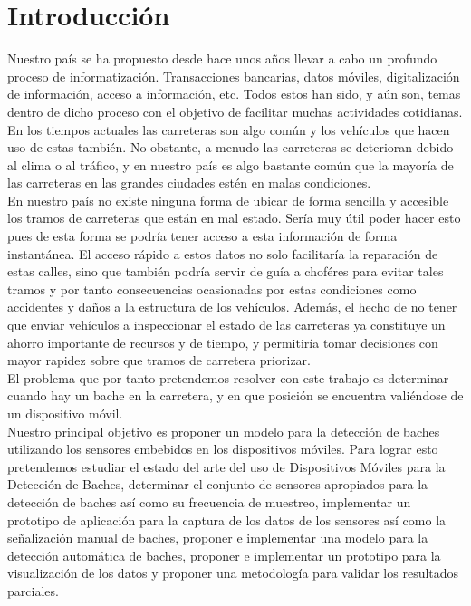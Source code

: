 \chapter*{Introducción}\label{chapter:introduction}

Nuestro país se ha propuesto desde hace unos años llevar a cabo un profundo proceso de informatización.
Transacciones bancarias, datos móviles, digitalización de información, acceso a información, etc. Todos
estos han sido, y aún son, temas dentro de dicho proceso con el objetivo de facilitar muchas actividades
cotidianas. En los tiempos actuales las carreteras son algo común y los vehículos que hacen uso de estas
también. No obstante, a menudo las carreteras se deterioran debido al clima o al tráfico, y en nuestro
país es algo bastante común que la mayoría de las carreteras en las grandes ciudades estén en malas condiciones.\\
En nuestro país no existe ninguna forma de ubicar de forma sencilla y accesible los tramos de carreteras que están
en mal estado. Sería muy útil poder hacer esto pues de esta forma se podría tener acceso a esta información de forma
instantánea. El acceso rápido a estos datos no solo facilitaría la reparación de estas calles, sino que también podría
servir de guía a choféres para evitar tales tramos y por tanto consecuencias ocasionadas por estas condiciones como 
accidentes y daños a la estructura de los vehículos. Además, el hecho de no tener que enviar vehículos a inspeccionar
el estado de las carreteras ya constituye un ahorro importante de recursos y de tiempo, y permitiría tomar decisiones 
con mayor rapidez sobre que tramos de carretera priorizar.\\
El problema que por tanto pretendemos resolver con este trabajo es determinar cuando hay un bache en la carretera, y
en que posición se encuentra valiéndose de un dispositivo móvil.\\
Nuestro principal objetivo es proponer un modelo para la detección de baches utilizando los sensores embebidos en los
dispositivos móviles. Para lograr esto pretendemos estudiar el estado del arte del uso de Dispositivos Móviles para
la Detección de Baches, determinar el conjunto de sensores apropiados para la detección de baches así como su
frecuencia de muestreo, implementar un prototipo de aplicación para la captura de los datos de los sensores así 
como la señalización manual de baches, proponer e implementar una modelo para la detección automática de baches,
proponer e implementar un prototipo para la visualización de los datos y proponer una metodología para validar los
resultados parciales.

